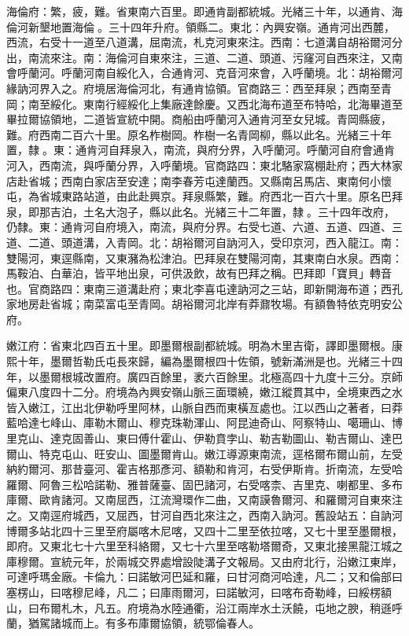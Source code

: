 \begin{pinyinscope}
海倫府：繁，疲，難。省東南六百里。即通肯副都統城。光緒三十年，以通肯、海倫河新墾地置海倫。三十四年升府。領縣二。東北：內興安嶺。通肯河出西麓，西流，右受十一道至八道溝，屈南流，札克河東來注。西南：七道溝自胡裕爾河分出，南流來注。南：海倫河自東來注，三道、二道、頭道、污窿河自西來注，又南會呼蘭河。呼蘭河南自綏化入，合通肯河、克音河來會，入呼蘭境。北：胡裕爾河緣訥河界入之。府境居海倫河北，有通肯協領。官商路三：西至拜泉；西南至青岡；南至綏化。東南行經綏化上集廠達餘慶。又西北海布道至布特哈，北海畢道至畢拉爾協領地，二道皆宣統中開。商船由呼蘭河入通肯河至女兒城。青岡縣疲，難。府西南二百六十里。原名柞樹岡。柞樹一名青岡柳，縣以此名。光緒三十年置，隸。東：通肯河自拜泉入，南流，與府分界，入呼蘭河。呼蘭河自府會通肯河入，西南流，與呼蘭分界，入呼蘭境。官商路四：東北駱家窩棚赴府；西大林家店赴省城；西南白家店至安達；南李春芳屯達蘭西。又縣南呂馬店、東南何小懷屯，為省城東路站道，由此赴興京。拜泉縣繁，難。府西北一百六十里。原名巴拜泉，即那吉泊，土名大泡子，縣以此名。光緒三十二年置，隸。三十四年改府，仍隸。東：通肯河自府境入，南流，與府分界。右受七道、六道、五道、四道、三道、二道、頭道溝，入青岡。北：胡裕爾河自訥河入，受印京河，西入龍江。南：雙陽河，東逕縣南，又東瀦為松津泊。巴拜泉在雙陽河南，其東南白水泉。西南：馬鞍泊、白華泊，皆平地出泉，可供汲飲，故有巴拜之稱。巴拜即「寶貝」轉音也。官商路四：東南三道溝赴府；東北李喜屯達訥河之三站，即新開海布道；西孔家地房赴省城；南菜富屯至青岡。胡裕爾河北岸有莽鼐牧場。有額魯特依克明安公府。

嫩江府：省東北四百五十里。即墨爾根副都統城。明為木里吉衛，譯即墨爾根。康熙十年，墨爾哲勒氏屯長來歸，編為墨爾根四十佐領，號新滿洲是也。光緒三十四年，以墨爾根城改置府。廣四百餘里，袤六百餘里。北極高四十九度十三分。京師偏東八度四十二分。府境為內興安嶺山脈三面環繞，嫩江縱貫其中，全境東西之水皆入嫩江，江出北伊勒呼里阿林，山脈自西而東橫亙處也。江以西山之著者，曰莽藍哈達七峰山、庫勒木爾山、穆克珠勒渾山、阿昆迪奇山、阿察特山、噶珊山、博里克山、達克固善山、東曰傅什霍山、伊勒賁孛山、勒吉勒圖山、勒吉爾山、達巴爾山、特克屯山、旺安山、圖墨爾肯山。嫩江導源東南流，逕格爾布爾山前，左受納約爾河、那昔臺河、霍吉格那彥河、額勒和肯河，右受伊斯肯。折南流，左受哈羅爾、阿魯三松哈諾勒、雅普薩臺、固巴諸河，右受喀柰、吉里克、喇都里、多布庫爾、歐肯諸河。又南屈西，江流灣環作二曲，又南謨魯爾河、和羅爾河自東來注之。又南逕府城西，又屈西，甘河自西北來注之，西南入訥河。舊設站五：自訥河博爾多站北四十三里至府屬喀木尼喀，又四十二里至依拉喀，又七十里至墨爾根，即府。又東北七十六里至科絡爾，又七十六里至喀勒塔爾奇，又東北接黑龍江城之庫穆爾。宣統元年，於兩城交界處增設陡溝子文報局。又由府北行，沿嫩江東岸，可達呼瑪金廠。卡倫九：曰諾敏河巴延和羅，曰甘河商河哈達，凡二；又和倫部曰塞楞山，曰喀穆尼峰，凡二；曰庫雨爾河，曰諾敏河，曰喀布奇勒峰，曰綏楞額山，曰布爾札木，凡五。府境為水陸通衢，沿江兩岸水土沃饒，屯地之腴，稍遜呼蘭，猶駕諸城而上。有多布庫爾協領，統鄂倫春人。


\end{pinyinscope}
